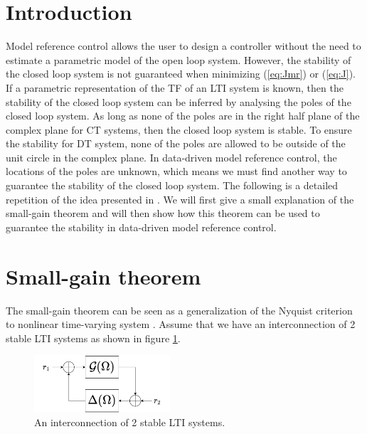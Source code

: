 \section{Introduction}
Model reference control allows the user to design a controller without the need to estimate a parametric model of the open loop system. However, the stability of the closed loop system is not guaranteed when minimizing (\ref{eq:Jmr}) or (\ref{eq:J}). If a parametric representation of the TF of an LTI system is known, then the stability of the closed loop system can be inferred by analysing the poles of the closed loop system. As long as none of the poles are in the right half plane of the complex plane for CT systems, then the closed loop system is stable. To ensure the stability for DT system, none of the poles are allowed to be outside of the unit circle in the complex plane. In data-driven model reference control, the locations of the poles are unknown, which means we must find another way to guarantee the stability of the closed loop system. The following is a detailed repetition of the idea presented in \cite{Data-driven_model_reference_control}. We will first give a small explanation of the small-gain theorem and will then show how this theorem can be used to guarantee the stability in data-driven model reference control. 

\section{Small-gain theorem}
The small-gain theorem can be seen as a generalization of the Nyquist criterion to nonlinear time-varying system \cite{Zames1966}. Assume that we have an interconnection of 2 stable LTI systems as shown in figure \ref{fig:interconnection}.

\begin{figure}[H]
\centering
\includegraphics[width = 0.45\textwidth]{figures/interconnection.pdf}
\caption{An interconnection of 2 stable LTI systems.}
\label{fig:interconnection}
\end{figure}

